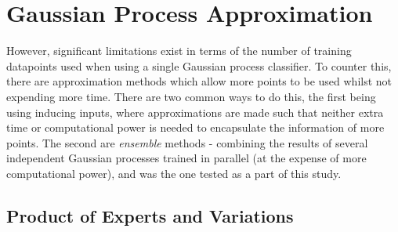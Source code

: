 
% 

\section{Gaussian Process Approximation} \label{chapsec:gp-approx}

However, significant limitations exist in terms of the number of training datapoints used when using a single Gaussian process classifier. To counter this, there are approximation methods which allow more points to be used whilst not expending more time. There are two common ways to do this, the first being using inducing inputs, where approximations are made such that neither extra time or computational power is needed to encapsulate the information of more points. The second are \textit{ensemble} methods - combining the results of several independent Gaussian processes trained in parallel (at the expense of more computational power), and was the one tested as a part of this study.

\subsection{Product of Experts and Variations}

